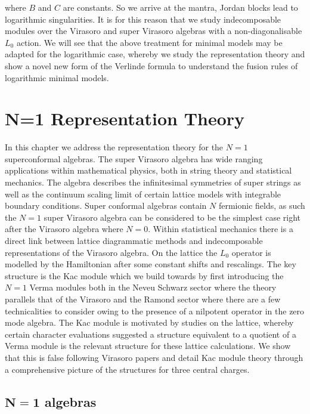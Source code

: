 \documentclass[a4paper,reqno,12pt]{report}
\theoremstyle{definition}
\numberwithin{equation}{section}
\theoremstyle{plain}
\begin{document}
where $B$ and $C$ are constants. So we arrive at the mantra, Jordan blocks lead to logarithmic singularities. It is for this reason that we study indecomposable modules over the Virasoro and super Virasoro algebras with a non-diagonalisable $L_0$ action. We will see that the above treatment for minimal models may be adapted for the logarithmic case, whereby we  study the representation theory and show a novel new form of the Verlinde formula to understand the fusion rules of logarithmic minimal models.





\chapter{N=1 Representation Theory}

In this chapter we address the representation theory for the $N=1$ superconformal algebras. The super Virasoro algebra has wide ranging applications within mathematical physics, both in string theory and statistical mechanics. The algebra describes the infinitesimal symmetries of super strings as well as the continuum scaling limit of certain lattice models with integrable boundary conditions. Super conformal algebras contain $N$ fermionic fields, as such the $N=1$ super Virasoro algebra can be considered to be the simplest case right after the Virasoro algebra where $N=0$.
Within statistical mechanics there is a direct link between lattice diagrammatic methods and indecomposable representations of the Virasoro algebra. On the lattice the $L_0$ operator is modelled by the Hamiltonian after some constant shifts and rescalings. The key structure is the Kac module which we build towards by first introducing the $N=1$ Verma modules both in the Neveu Schwarz sector where the theory parallels that of the Virasoro and the Ramond sector where there are a few technicalities to consider owing to the presence of a nilpotent operator in the zero mode algebra. The Kac module is motivated by studies on the lattice, whereby certain character evaluations suggested a structure equivalent to a quotient of a Verma module is the relevant structure for these lattice calculations. We show that this is false following Virasoro papers \cite{RasCla11,MorKac14} and detail Kac module theory through a comprehensive picture of the  structures for three central charges.


\section{$\bm{N=1}$ algebras} \label{sec:Alg}
\end{document}
